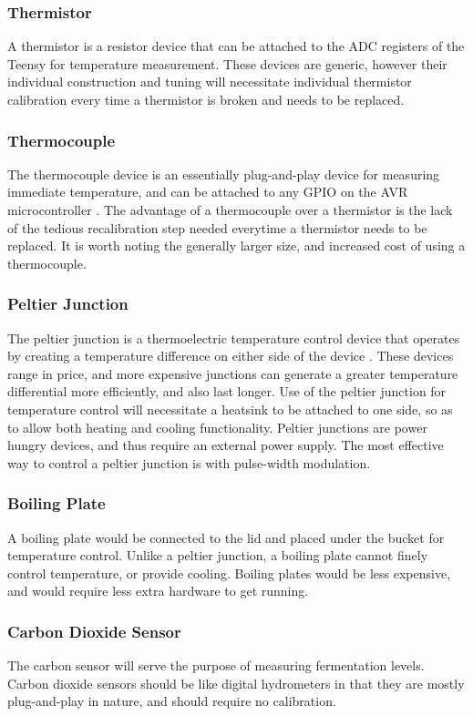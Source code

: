 \documentclass[draftclsnofoot,onecolumn,letterpaper,10pt]{IEEEtran}
\begin{document}
\subsubsection{Thermistor}
A thermistor is a resistor device that can be attached to the ADC registers of the Teensy for temperature measurement.
These devices are generic, however their individual construction and tuning will necessitate individual thermistor calibration every time a thermistor
	is broken and needs to be replaced.
\subsubsection{Thermocouple}
The thermocouple device is an essentially plug-and-play device for measuring immediate temperature, and can be attached to 
	any GPIO on the AVR microcontroller \cite{thermocouple}. 
The advantage of a thermocouple over a thermistor is the lack of the tedious recalibration step needed everytime a thermistor 
	needs to be replaced. 
It is worth noting the generally larger size, and increased cost of using a thermocouple.
\subsubsection{Peltier Junction}
The peltier junction is a thermoelectric temperature control device that operates by creating a temperature difference on either side of the 
	device \cite{peltier}.
These devices range in price, and more expensive junctions can generate a greater temperature differential more efficiently, and also last longer.
Use of the peltier junction for temperature control will necessitate a heatsink to be attached to one side, so as to allow both heating and cooling 
	functionality.
Peltier junctions are power hungry devices, and thus require an external power supply.
The most effective way to control a peltier junction is with pulse-width modulation.
\subsubsection{Boiling Plate}
A boiling plate would be connected to the lid and placed under the bucket for temperature control.
Unlike a peltier junction, a boiling plate cannot finely control temperature, or provide cooling.
Boiling plates would be less expensive, and would require less extra hardware to get running.
\subsubsection{Carbon Dioxide Sensor}
The carbon sensor will serve the purpose of measuring fermentation levels.
Carbon dioxide sensors should be like digital hydrometers in that they are mostly plug-and-play in nature, and should require no calibration.
\end{document}
